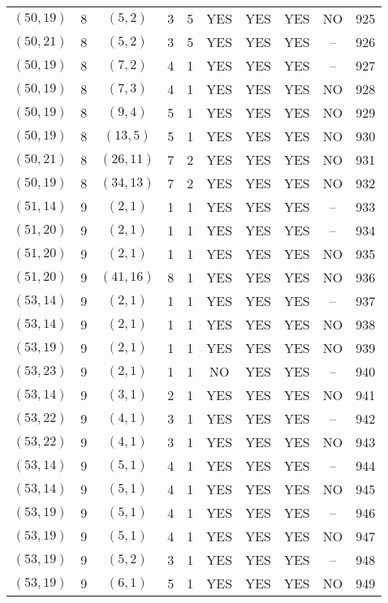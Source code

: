 \begin{longtable}{|c|c|c|c|c|c|c|c|c|c|}
$(50, 19)$ & 8 & $(5, 2)$ & 3 & 5 & YES & YES & YES & NO & 925\\
$(50, 21)$ & 8 & $(5, 2)$ & 3 & 5 & YES & YES & YES & -- & 926\\
$(50, 19)$ & 8 & $(7, 2)$ & 4 & 1 & YES & YES & YES & -- & 927\\
$(50, 19)$ & 8 & $(7, 3)$ & 4 & 1 & YES & YES & YES & NO & 928\\
$(50, 19)$ & 8 & $(9, 4)$ & 5 & 1 & YES & YES & YES & NO & 929\\
$(50, 19)$ & 8 & $(13, 5)$ & 5 & 1 & YES & YES & YES & NO & 930\\
$(50, 21)$ & 8 & $(26, 11)$ & 7 & 2 & YES & YES & YES & NO & 931\\
$(50, 19)$ & 8 & $(34, 13)$ & 7 & 2 & YES & YES & YES & NO & 932\\
$(51, 14)$ & 9 & $(2, 1)$ & 1 & 1 & YES & YES & YES & -- & 933\\
$(51, 20)$ & 9 & $(2, 1)$ & 1 & 1 & YES & YES & YES & -- & 934\\
$(51, 20)$ & 9 & $(2, 1)$ & 1 & 1 & YES & YES & YES & NO & 935\\
$(51, 20)$ & 9 & $(41, 16)$ & 8 & 1 & YES & YES & YES & NO & 936\\
$(53, 14)$ & 9 & $(2, 1)$ & 1 & 1 & YES & YES & YES & -- & 937\\
$(53, 14)$ & 9 & $(2, 1)$ & 1 & 1 & YES & YES & YES & NO & 938\\
$(53, 19)$ & 9 & $(2, 1)$ & 1 & 1 & YES & YES & YES & NO & 939\\
$(53, 23)$ & 9 & $(2, 1)$ & 1 & 1 & NO & YES & YES & -- & 940\\
$(53, 14)$ & 9 & $(3, 1)$ & 2 & 1 & YES & YES & YES & NO & 941\\
$(53, 22)$ & 9 & $(4, 1)$ & 3 & 1 & YES & YES & YES & -- & 942\\
$(53, 22)$ & 9 & $(4, 1)$ & 3 & 1 & YES & YES & YES & NO & 943\\
$(53, 14)$ & 9 & $(5, 1)$ & 4 & 1 & YES & YES & YES & -- & 944\\
$(53, 14)$ & 9 & $(5, 1)$ & 4 & 1 & YES & YES & YES & NO & 945\\
$(53, 19)$ & 9 & $(5, 1)$ & 4 & 1 & YES & YES & YES & -- & 946\\
$(53, 19)$ & 9 & $(5, 1)$ & 4 & 1 & YES & YES & YES & NO & 947\\
$(53, 19)$ & 9 & $(5, 2)$ & 3 & 1 & YES & YES & YES & -- & 948\\
$(53, 19)$ & 9 & $(6, 1)$ & 5 & 1 & YES & YES & YES & NO & 949\\

\end{longtable}
